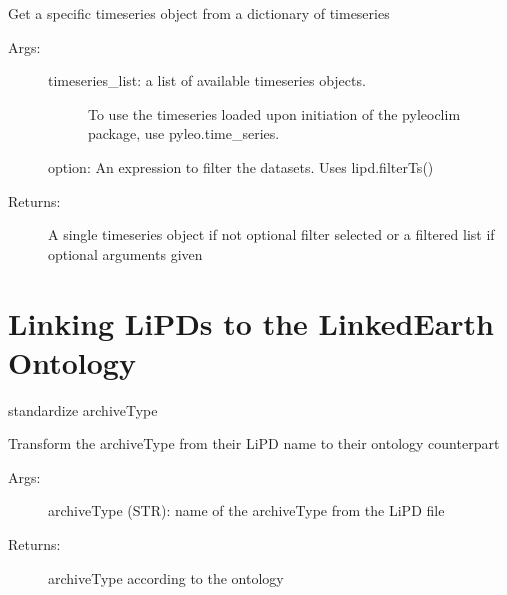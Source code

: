 \documentclass[letterpaper,10pt,english]{sphinxmanual}
\begin{document}

\begin{fulllineitems}
\label{\detokenize{LipdUtils:pyleoclim.LipdUtils.getTs}}
Get a specific timeseries object from a dictionary of timeseries
\begin{description}
\item[{Args:}] \leavevmode\begin{description}
\item[{timeseries\_list: a  list of available timeseries objects. }] \leavevmode
To use the timeseries loaded upon initiation of the 
pyleoclim package, use pyleo.time\_series.

\end{description}

option: An expression to filter the datasets. Uses lipd.filterTs()

\item[{Returns:}] \leavevmode
A single timeseries object if not optional filter selected or a filtered
list if optional arguments given

\end{description}

\end{fulllineitems}



\section{Linking LiPDs to the LinkedEarth Ontology}
\label{\detokenize{LipdUtils:linking-lipds-to-the-linkedearth-ontology}}

\begin{fulllineitems}
\label{\detokenize{LipdUtils:pyleoclim.LipdUtils.LipdToOntology}}
standardize archiveType

Transform the archiveType from their LiPD name to their ontology counterpart
\begin{description}
\item[{Args:}] \leavevmode
archiveType (STR): name of the archiveType from the LiPD file

\item[{Returns:}] \leavevmode
archiveType according to the ontology

\end{description}

\end{fulllineitems}
\end{document}
